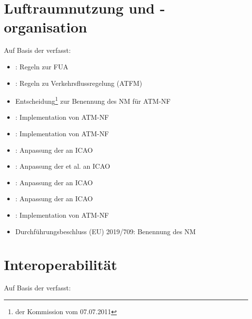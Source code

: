 \section{Luftraumnutzung und -organisation} 
    Auf Basis der  verfasst:

    \begin{itemize}
        \item {}: Regeln zur \ac{FUA}
        \item {}: Regeln zu Verkehrsflussregelung (\acs{ATFM})
        \item Entscheidung\footnote{der Kommission vom 07.07.2011} zur Benennung des \acf{NM} für \ac{ATM}-\acs{NF}
        \item {}\textdagger: Implementation von \ac{ATM}-\ac{NF}
        \item {}: Implementation von \ac{ATM}-\acs{NF}
        \item {}: Anpassung der  an \acs{ICAO}  %
        \item {}: Anpassung der  et al. an \acs{ICAO}  %
        \item {}: Anpassung der  an \acs{ICAO}  %
        \item {}: Anpassung der  an \acs{ICAO} %
        \item {}: Implementation von \ac{ATM}-\ac{NF}
        \item Durchführungsbeschluss (\acs{EU}) 2019/709: Benennung des \ac{NM} 
    \end{itemize}

\section{Interoperabilität} 
    Auf Basis der  verfasst:

